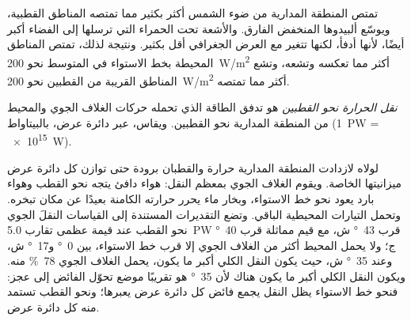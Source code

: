 تمتص المنطقة المدارية من ضوء الشمس أكثر بكثير مما تمتصه المناطق القطبية، ويوسّع
ألبيدوها المنخفض الفارق. والأشعة تحت الحمراء التي ترسلها إلى الفضاء أكبر أيضًا،
لأنها أدفأ، لكنها تتغير مع العرض الجغرافي أقل بكثير. ونتيجة لذلك، تمتص المناطق
المحيطة بخط الاستواء في المتوسط نحو \qty{200}{W/m^2} أكثر مما تعكسه وتشعه، وتشع
المناطق القريبة من القطبين نحو \qty{200}{W/m^2} أكثر مما
تمتصه.

\begin{definition}\label{def:g10:earth-energy-budget:heat-transport}
\emph{نقل الحرارة نحو القطبين} هو تدفق الطاقة
الذي تحمله حركات الغلاف الجوي والمحيط من المنطقة المدارية نحو القطبين. ويقاس،
عبر دائرة عرض، بالبيتاواط (\qty{1}{PW} = \qty{e15}{W}).
\end{definition}

لولاه لازدادت المنطقة المدارية حرارة والقطبان برودة حتى توازن كل دائرة عرض
ميزانيتها الخاصة. ويقوم الغلاف الجوي بمعظم النقل: هواء دافئ يتجه نحو القطب وهواء
بارد يعود نحو خط الاستواء، وبخار ماء يحرر حرارته الكامنة بعيدًا عن مكان تبخره.
وتحمل التيارات المحيطية الباقي. وتضع التقديرات المستندة إلى القياسات النقلَ
الجوي نحو القطب عند قيمة عظمى تقارب \qty{5.0}{PW} قرب
\qty{43}{\degree} ش، مع قيم مماثلة قرب \qty{40}{\degree} ج؛ ولا يحمل المحيط أكثر
من الغلاف الجوي إلا قرب خط الاستواء، بين
\qty{0}{\degree} و\qty{17}{\degree} ش، وعند \qty{35}{\degree} ش، حيث يكون النقل
الكلي أكبر ما يكون، يحمل الغلاف الجوي \qty{78}{\percent}
منه. ويكون النقل الكلي أكبر ما يكون هناك لأن \qty{35}{\degree} هو تقريبًا موضع
تحوّل الفائض إلى عجز: فنحو خط الاستواء يظل النقل يجمع فائض كل دائرة عرض يعبرها؛
ونحو القطب تستمد منه كل دائرة عرض.

